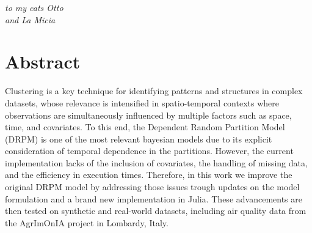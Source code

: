 \documentclass[12pt,	%
	a4paper,		%
	twoside,		%
	openright,		%
	titlepage,%
	]{book}
\theoremstyle{definition}
\begin{document}
%
\frontmatter

% 

% 
%

% 
% 
% 
% 
% 
% 


\cleardoublepage
{}
\thispagestyle{empty}
\begin{flushright}
\textit{to my cats Otto\\ and La Micia}



\end{flushright}

\cleardoublepage

\chapter*{Abstract}

Clustering is a key technique for identifying patterns and structures in complex datasets, whose relevance is intensified in spatio-temporal contexts where observations are simultaneously influenced by multiple factors such as space, time, and covariates. To this end, the Dependent Random Partition Model (DRPM) is one of the most relevant bayesian models due to its explicit consideration of temporal dependence in the partitions. However, the current implementation lacks of the inclusion of covariates, the handling of missing data, and the efficiency in execution times. Therefore, in this work we improve the original DRPM model by addressing those issues trough updates on the model formulation and a brand new implementation in Julia. These advancements are then tested on synthetic and real-world datasets, including air quality data from the AgrImOnIA project in Lombardy, Italy.
\end{document}
